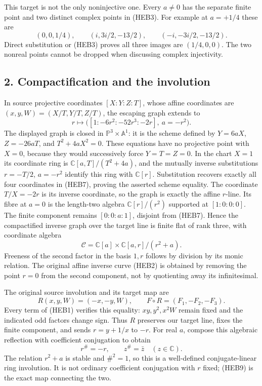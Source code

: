 \documentclass[
  10pt,
  a4paper,
]{article}
\begin{document}
This target is not the only noninjective one. Every \(a\ne0\) has the
separate finite point and two distinct complex points in (HEB3). For
example at \(a=+1/4\) these are \[
(0,0,1/4),\qquad(i,3i/2,-13/2),\qquad(-i,-3i/2,-13/2).
\tag{HEB6}
\] Direct substitution or (HEB3) proves all three images are
\((1/4,0,0)\). The two nonreal points cannot be dropped when discussing
complex injectivity.

\subsection{2. Compactification and the
involution}\label{compactification-and-the-involution}

In source projective coordinates \([X:Y:Z:T]\), whose affine coordinates
are \((x,y,W)=(X/T,Y/T,Z/T)\), the escaping graph extends to \[
r\longmapsto\bigl([1:-6r^2:-52r^3:-2r],\ a=-r^2\bigr).
\tag{HEB7}
\] The displayed graph is closed in \(\mathbb P^3\times\mathbb A^1\): it
is the scheme defined by \(Y=6aX\), \(Z=-26aT\), and \(T^2+4aX^2=0\).
These equations have no projective point with \(X=0\), because they
would successively force \(Y=T=Z=0\). In the chart \(X=1\) its
coordinate ring is \(\mathbb C[a,T]/(T^2+4a)\), and the mutually inverse
substitutions \(r=-T/2\), \(a=-r^2\) identify this ring with
\(\mathbb C[r]\). Substitution recovers exactly all four coordinates in
(HEB7), proving the asserted scheme equality. The coordinate \(T/X=-2r\)
is its inverse coordinate, so the graph is exactly the affine
\(r\)-line. Its fibre at \(a=0\) is the length-two algebra
\(\mathbb C[r]/(r^2)\) supported at \([1:0:0:0]\). The finite component
remains \([0:0:a:1]\), disjoint from (HEB7). Hence the compactified
inverse graph over the target line is finite flat of rank three, with
coordinate algebra \[
\mathcal C=\mathbb C[a]\times\mathbb C[a,r]/(r^2+a).
\tag{HEB8}
\] Freeness of the second factor in the basis \(1,r\) follows by
division by its monic relation. The original affine inverse curve (HEB2)
is obtained by removing the point \(r=0\) from the second component, not
by quotienting away its infinitesimal.

The original source involution and its target map are \[
R(x,y,W)=(-x,-y,W),\qquad
F\circ R=(F_1,-F_2,-F_3).
\tag{HEB9}
\] Every term of (HEB1) verifies this equality: \(xy,y^2,x^2W\) remain
fixed and the indicated odd factors change sign. Thus \(R\) preserves
our target line, fixes the finite component, and sends \(r=y+1/x\) to
\(-r\). For real \(a\), compose this algebraic reflection with
coefficient conjugation to obtain \[
r^\#=-r,\qquad z^\#=\bar z\quad(z\in\mathbb C).
\tag{HEB10}
\] The relation \(r^2+a\) is stable and \(\#^2=1\), so this is a
well-defined conjugate-linear ring involution. It is not ordinary
coefficient conjugation with \(r\) fixed; (HEB9) is the exact map
connecting the two.
\end{document}
